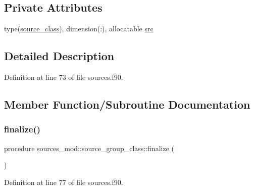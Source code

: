 \subsection*{Private Attributes}
\begin{DoxyCompactItemize}
\item 
type(\mbox{\hyperlink{structsources__mod_1_1source__class}{source\+\_\+class}}), dimension(\+:), allocatable \mbox{\hyperlink{structsources__mod_1_1source__group__class_af970ce2c935528f707bdbf4169995d7c}{src}}
\end{DoxyCompactItemize}


\subsection{Detailed Description}


Definition at line 73 of file sources.\+f90.



\subsection{Member Function/\+Subroutine Documentation}
\mbox{\label{structsources__mod_1_1source__group__class_ab1f12af6502f7e468e07d82555ea5cb9}} 
\subsubsection{\texorpdfstring{finalize()}{finalize()}}
{\footnotesize\ttfamily procedure sources\+\_\+mod\+::source\+\_\+group\+\_\+class\+::finalize (\begin{DoxyParamCaption}{ }\end{DoxyParamCaption})\hspace{0.3cm}{\ttfamily [private]}}



Definition at line 77 of file sources.\+f90.

\mbox{\label{structsources__mod_1_1source__group__class_a186abc677118adbf1f9cff405dac330e}} 
